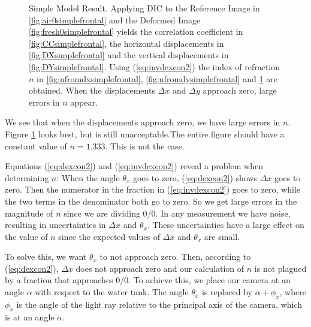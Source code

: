 \documentclass{svjour3}                     %
\begin{document}
\begin{figure}[htbp]
\begin{subfigure}{.45\linewidth}
	\label{fig:nfrontal}
\end{subfigure}
\caption{Simple Model Result. Applying DIC to the Reference Image in \ref{fig:air0simplefrontal} and the Deformed Image \ref{fig:fresh0simplefrontal} yields the correlation coefficient in \ref{fig:CCsimplefrontal}, the horizontal displacements in \ref{fig:DXsimplefrontal} and the vertical displacements in \ref{fig:DYsimplefrontal}. Using (\ref{eq:invdexcon2}) the index of refraction $n$ in \ref{fig:nfromdxsimplefrontal}, \ref{fig:nfromdysimplefrontal} and \ref{fig:nfrontal} are obtained. When the displacements $\Delta x$ and $\Delta y$ approach zero, large errors in $n$ appear. }
\label{fig:simmod}
\end{figure} %

We see that when the displacements approach zero, we have large errors in $n$. Figure \ref{fig:nfrontal} looks best, but is still unacceptable.The entire figure should have a constant value of $n = 1.333$. This is not the case.
 
Equations (\ref{eq:dexcon2}) and (\ref{eq:invdexcon2}) reveal a problem when determining $n$: When the angle $\theta_x$ goes to zero, (\ref{eq:dexcon2}) shows $\Delta x$ goes to zero. Then the numerator in the fraction in (\ref{eq:invdexcon2}) goes to zero, while the two terms in the denominator both go to zero. So we get large errors in the magnitude of $n$ since we are dividing $0/0$. In any measurement we have noise, resulting in uncertainties in $\Delta x$ and $\theta_x$. These uncertainties have a large effect on the value of $n$ since the expected values of $\Delta x$ and $\theta_x$ are small. %

To solve this, we want $\theta_x$ to not approach zero. Then, according to (\ref{eq:dexcon2}), $\Delta x$ does not approach zero and our calculation of $n$ is not plagued by a fraction that approaches $0/0$. To achieve this, we place our camera at an angle $\alpha$ with respect to the water tank. The angle $\theta_x$ is replaced by $\alpha+\phi_x$, where $\phi_x$ is the angle of the light ray relative to the principal axis of the camera, which is at an angle $\alpha$. %
\end{document}
